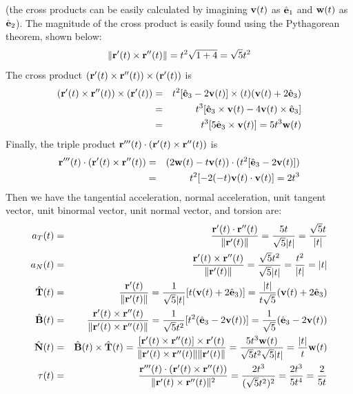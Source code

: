 \documentclass[12pt]{amsbook}
\begin{document}
(the cross products can be easily calculated by imagining ${\bf v}(t)$ as $\hat{\bf e}_1$ and ${\bf w}(t)$ as $\hat{\bf e}_2$). The magnitude of the cross product is easily found using the Pythagorean theorem, shown below:
$$\|{\bf r}'(t)\times{\bf r}''(t)\|=t^2\sqrt{1+4}=\sqrt{5}t^2$$
The cross product $({\bf r}'(t)\times{\bf r}''(t))\times({\bf r}'(t))$ is
\begin{eqnarray*}
({\bf r}'(t)\times{\bf r}''(t))\times({\bf r}'(t))&=&t^2[\hat{\bf e}_3-2{\bf v}(t)] \times(t)({\bf v}(t)+2\hat{\bf e}_3) \\
&=&t^3[\hat{\bf e}_3\times{\bf v}(t)-4{\bf v}(t)\times\hat{\bf e}_3] \\
&=&t^3[5\hat{\bf e}_3\times{\bf v}(t)]=5t^3{\bf w}(t)
\end{eqnarray*}
Finally, the triple product $ {\bf r}'''(t)\cdot({\bf r}'(t)\times{\bf r}''(t))$ is
\begin{eqnarray*}
{\bf r}'''(t)\cdot({\bf r}'(t)\times{\bf r}''(t))&=&(2{\bf w}(t)-t{\bf v}(t))\cdot(t^2[\hat{\bf e}_3-2{\bf v}(t)]) \\
&=&t^2[-2(-t){\bf v}(t)\cdot{\bf v}(t)]=2t^3
\end{eqnarray*}
Then we have the tangential acceleration, normal acceleration, unit tangent vector, unit binormal vector, unit normal vector, and torsion are:
\begin{eqnarray*}
a_T(t)&=&\frac{{\bf r}'(t)\cdot{\bf r}''(t)}{\|{\bf r}'(t)\|}=\frac{5t}{\sqrt{5}|t|}=\frac{\sqrt{5}t}{|t|} \\
a_N(t)&=&\frac{{\bf r}'(t)\times{\bf r}''(t)}{\|{\bf r}'(t)\|}=\frac{\sqrt{5}t^2}{\sqrt{5}|t|}=\frac{t^2}{|t|}=|t| \\
\hat{\bf T}(t)&=&\frac{{\bf r}'(t)}{\|{\bf r}'(t)\|}=\frac{1}{\sqrt{5}|t|}[t({\bf v}(t)+2\hat{\bf e}_3)]=\frac{|t|}{t\sqrt{5}}({\bf v}(t)+2\hat{\bf e}_3)\\
\hat{\bf B}(t)&=&\frac{{\bf r}'(t)\times{\bf r}''(t)}{\|{\bf r}'(t)\times{\bf r}''(t)\|}=\frac{1}{\sqrt{5}t^2}[t^2(\hat{\bf e}_3-2{\bf v}(t))]=\frac{1}{\sqrt{5}}(\hat{\bf e}_3-2{\bf v}(t))\\
\hat{\bf N}(t)&=&\hat{\bf B}(t)\times\hat{\bf T}(t)=\frac{[{\bf r}'(t)\times{\bf r}''(t)]\times{\bf r}'(t)}{\|{\bf r}'(t)\times{\bf r}''(t)\|\|{\bf r}'(t)\|}=\frac{5t^3{\bf w}(t)}{\sqrt{5}t^2\sqrt{5}|t|}=\frac{|t|}{t}{\bf w}(t)\\
\tau(t)&=&\frac{{\bf r}'''(t)\cdot({\bf r}'(t)\times{\bf r}''(t))}{\|{\bf r}'(t)\times{\bf r}''(t)\|^2}=\frac{2t^3}{(\sqrt{5}t^2)^2}=\frac{2t^3}{5t^4}=\frac{2}{5t}
\end{eqnarray*}
\end{document}
